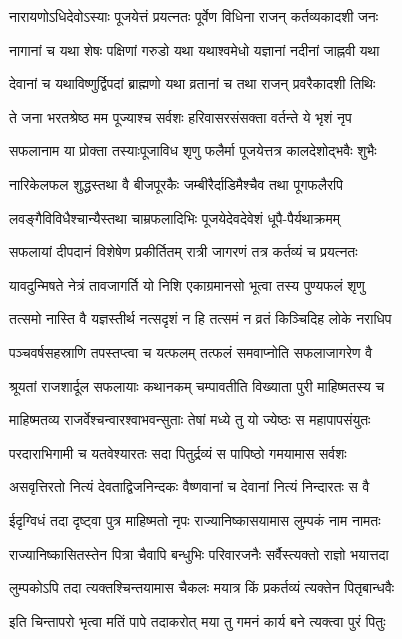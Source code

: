 \twolineshloka
{नारायणोऽधिदेवोऽस्याः पूजयेत्तं प्रयत्नतः}
{पूर्वेण विधिना राजन् कर्तव्यकादशी जनः} %

\twolineshloka
{नागानां च यथा शेषः पक्षिणां गरुडो यथा}
{यथाश्वमेधो यज्ञानां नदीनां जाह्नवी यथा} %

\twolineshloka
{देवानां च यथाविष्णुर्द्विपदां ब्राह्मणो यथा}
{व्रतानां च तथा राजन् प्रवरैकादशी तिथिः} %

\twolineshloka
{ते जना भरतश्रेष्ठ मम पूज्याश्च सर्वशः}
{हरिवासरसंसक्ता वर्तन्ते ये भृशं नृप} %

\twolineshloka
{सफलानाम या प्रोक्ता तस्याःपूजाविध शृणु}
{फलैर्मा पूजयेत्तत्र कालदेशोद्भवैः शुभैः} %

\twolineshloka
{नारिकेलफल शुद्धस्तथा वै बीजपूरकैः}
{जम्बीरैर्दाडिमैश्चैव तथा पूगफलैरपि} %

\twolineshloka
{लवङ्गैविविधैश्चान्यैस्तथा चाम्रफलादिभिः}
{पूजयेदेवदेवेशं धूपै-पैर्यथाक्रमम्} %

\twolineshloka
{सफलायां दीपदानं विशेषेण प्रकीर्तितम्}
{रात्री जागरणं तत्र कर्तव्यं च प्रयत्नतः} %

\twolineshloka
{यावदुन्मिषते नेत्रं तावजागर्ति यो निशि}
{एकाग्रमानसो भूत्वा तस्य पुण्यफलं शृणु} %

\twolineshloka
{तत्समो नास्ति वै यज्ञस्तीर्थ नत्सदृशं न हि}
{तत्समं न व्रतं किञ्चिदिह लोके नराधिप} %

\twolineshloka
{पञ्चवर्षसहस्राणि तपस्तप्त्वा च यत्फलम्}
{तत्फलं समवाप्नोति सफलाजागरेण वै} %

\twolineshloka
{श्रूयतां राजशार्दूल सफलायाः कथानकम्}
{चम्पावतीति विख्याता पुरी माहिष्मतस्य च} %

\twolineshloka
{माहिष्मतव्य राजर्वेश्चन्वारश्वाभवन्सुताः}
{तेषां मध्ये तु यो ज्येष्ठः स महापापसंयुतः} %

\twolineshloka
{परदाराभिगामी च यतवेश्यारतः सदा}
{पितुर्द्रव्यं स पापिष्ठो गमयामास सर्वशः} %

\twolineshloka
{असवृत्तिरतो नित्यं देवताद्विजनिन्दकः}
{वैष्णवानां च देवानां नित्यं निन्दारतः स वै} %

\twolineshloka
{ईदृग्विधं तदा दृष्ट्वा पुत्र माहिष्मतो नृपः}
{राज्यानिष्कासयामास लुम्पकं नाम नामतः} %

\twolineshloka
{राज्यानिष्कासितस्तेन पित्रा चैवापि बन्धुभिः}
{परिवारजनैः सर्वैस्त्यक्तो राज्ञो भयात्तदा} %

\twolineshloka
{लुम्पकोऽपि तदा त्यक्तश्चिन्तयामास चैकलः}
{मयात्र किं प्रकर्तव्यं त्यक्तेन पितृबान्धवैः} %

\twolineshloka
{इति चिन्तापरो भृत्वा मतिं पापे तदाकरोत्}
{मया तु गमनं कार्य बने त्यक्त्वा पुरं पितुः} %

